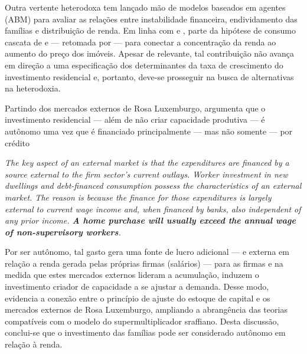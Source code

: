 Outra vertente heterodoxa tem lançado mão de modelos baseados em agentes (ABM) para avaliar as relações entre instabilidade financeira, endividamento das famílias e distribuição de renda.
Em linha com \textcite{cynamon_inequality_2013} e \textcite{erlingsson_integrating_2013}, \textcite{cardaci_inequality_2018} parte da hipótese de consumo cascata de \textcite{veblen_theory_1899} e \textcite{duesenberry_income_1949} --- retomada por \textcite{frank_expenditure_2014} --- para conectar a concentração da renda ao aumento do preço dos imóveis.
Apesar de relevante, tal contribuição não avança em direção a uma especificação dos determinantes da taxa de crescimento do investimento residencial e, portanto, deve-se prosseguir na busca de alternativas na heterodoxia.

Partindo dos mercados externos de Rosa Luxemburgo, \textcite{fiebiger_semi-autonomous_2018} argumenta que o investimento residencial --- além de não criar capacidade produtiva --- é autônomo uma vez que é financiado principalmente --- mas não somente --- por crédito

\begin{citacao}
	\textit{The key aspect of an external market is that the expenditures
		are financed by a source external to the firm sector’s current outlays. Worker investment in new dwellings and debt-financed consumption possess the characteristics of
		an external market. The reason is because the finance for those expenditures is largely
		external to current wage income and, when financed by banks, also independent of any
		prior income. \textbf{A home purchase will usually exceed the annual wage of non-supervisory
			workers}.
	}
	\cite[p.~3, grifos adicionados]{fiebiger_semi-autonomous_2018}
\end{citacao}
Por ser autônomo, tal gasto gera uma fonte de lucro adicional --- e externa em relação a renda gerada pelas próprias firmas (salários) --- para as firmas e na medida que estes mercados externos lideram a acumulação, induzem o investimento criador de capacidade a se ajustar a demanda.
Desse modo, \textcite{fiebiger_semi-autonomous_2018} evidencia a conexão entre o princípio de ajuste do estoque de capital e os mercados externos de Rosa Luxemburgo, ampliando a abrangência das teorias compatíveis com o modelo do supermultiplicador sraffiano.
Desta discussão, conclui-se que o investimento das famílias pode ser considerado autônomo em relação à renda. 

